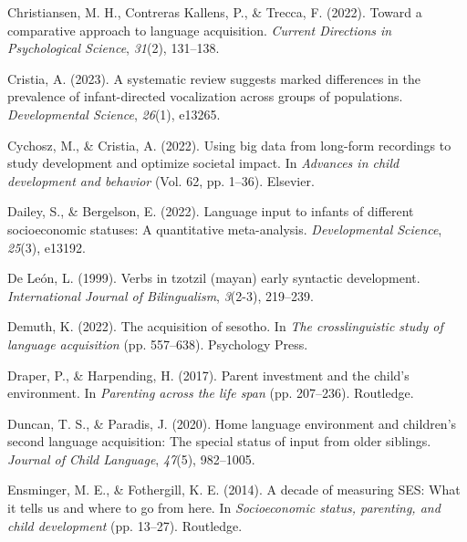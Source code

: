 \documentclass[
  man,floatsintext]{apa6}
\newlength{\cslhangindent}
\newlength{\cslentryspacingunit} %
\newenvironment{CSLReferences}[2] %
 {%
  \setlength{\parindent}{0pt}
  \ifodd #1
  \let\oldpar\par
  \def\par{\hangindent=\cslhangindent\oldpar}
  \fi
  \setlength{\parskip}{#2\cslentryspacingunit}
 }%
 {}
\begin{document}
\begin{CSLReferences}{1}{0}
\leavevmode{}%
Christiansen, M. H., Contreras Kallens, P., \& Trecca, F. (2022). Toward a comparative approach to language acquisition. \emph{Current Directions in Psychological Science}, \emph{31}(2), 131--138.

\leavevmode{}%
Cristia, A. (2023). A systematic review suggests marked differences in the prevalence of infant-directed vocalization across groups of populations. \emph{Developmental Science}, \emph{26}(1), e13265.

\leavevmode{}%
Cychosz, M., \& Cristia, A. (2022). Using big data from long-form recordings to study development and optimize societal impact. In \emph{Advances in child development and behavior} (Vol. 62, pp. 1--36). Elsevier.

\leavevmode{}%
Dailey, S., \& Bergelson, E. (2022). Language input to infants of different socioeconomic statuses: A quantitative meta-analysis. \emph{Developmental Science}, \emph{25}(3), e13192.

\leavevmode{}%
De León, L. (1999). Verbs in tzotzil (mayan) early syntactic development. \emph{International Journal of Bilingualism}, \emph{3}(2-3), 219--239.

\leavevmode{}%
Demuth, K. (2022). The acquisition of sesotho. In \emph{The crosslinguistic study of language acquisition} (pp. 557--638). Psychology Press.

\leavevmode{}%
Draper, P., \& Harpending, H. (2017). Parent investment and the child's environment. In \emph{Parenting across the life span} (pp. 207--236). Routledge.

\leavevmode{}%
Duncan, T. S., \& Paradis, J. (2020). Home language environment and children's second language acquisition: The special status of input from older siblings. \emph{Journal of Child Language}, \emph{47}(5), 982--1005.

\leavevmode{}%
Ensminger, M. E., \& Fothergill, K. E. (2014). A decade of measuring SES: What it tells us and where to go from here. In \emph{Socioeconomic status, parenting, and child development} (pp. 13--27). Routledge.


\end{CSLReferences}
\end{document}
